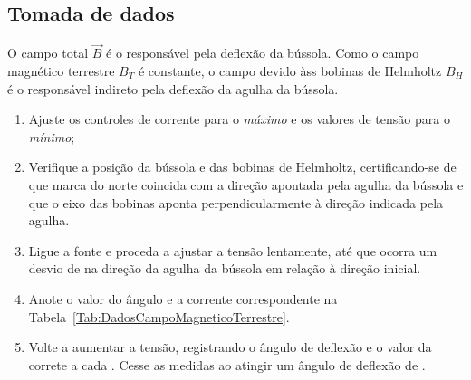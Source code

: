 \subsection{Tomada de dados}

\begin{marginfigure}[4cm]
\centering
{}
\caption{O campo total $\vec{B}$ é o responsável pela deflexão da bússola. Como o campo magnético terrestre $B_T$ é constante, o campo devido àss bobinas de Helmholtz $B_H$ é o responsável indireto pela deflexão da agulha da bússola.}
\end{marginfigure}

\begin{enumerate}
	\item Ajuste os controles de corrente para o \emph{máximo} e os valores de tensão para o \emph{mínimo};
	\item Verifique a posição da bússola e das bobinas de Helmholtz, certificando-se de que marca do norte coincida com a direção apontada pela agulha da bússola e que o eixo das bobinas aponta perpendicularmente à direção indicada pela agulha.
	\item Ligue a fonte e proceda a ajustar a tensão lentamente, até que ocorra um desvio de  na direção da agulha da bússola em relação à direção inicial.
	\item Anote o valor do ângulo e a corrente correspondente na Tabela~\ref{Tab:DadosCampoMagneticoTerrestre}.
	\item Volte a aumentar a tensão, registrando o ângulo de deflexão e o valor da correte a cada . Cesse as medidas ao atingir um ângulo de deflexão de .
\end{enumerate}

